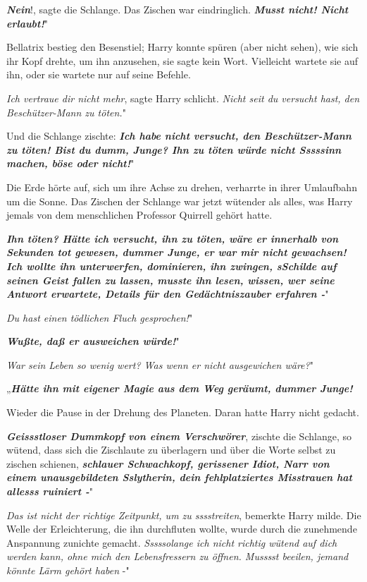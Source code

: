 \glqq \textbf{\emph{Nein}}!\grqq{}, sagte die Schlange. Das Zischen war
eindringlich. \glqq \textbf{\emph{Musst nicht! Nicht erlaubt!}}"

Bellatrix bestieg den Besenstiel; Harry konnte spüren (aber nicht sehen), wie
sich ihr Kopf drehte, um ihn anzusehen, sie sagte kein Wort. Vielleicht wartete
sie auf ihn, oder sie wartete nur auf seine Befehle.

\glqq \emph{Ich vertraue dir nicht mehr}\grqq{}, sagte Harry schlicht. \glqq
\emph{Nicht seit du versucht hast, den Beschützer-Mann zu töten.}"

Und die Schlange zischte: \glqq \textbf{\emph{Ich habe nicht versucht, den
Beschützer-Mann zu töten! Bist du dumm, Junge? Ihn zu töten würde nicht Sssssinn
machen, böse oder nicht!}}"

Die Erde hörte auf, sich um ihre Achse zu drehen, verharrte in ihrer Umlaufbahn
um die Sonne. Das Zischen der Schlange war jetzt wütender als alles, was Harry
jemals von dem menschlichen Professor Quirrell gehört hatte.

\glqq \textbf{\emph{Ihn töten? Hätte ich versucht, ihn zu töten, wäre er
innerhalb von Sekunden tot gewesen, dummer Junge, er war mir nicht gewachsen!
Ich wollte ihn unterwerfen, dominieren, ihn zwingen, sSchilde auf seinen Geist
fallen zu lassen, musste ihn lesen, wissen, wer seine Antwort erwartete, Details
für den Gedächtniszauber erfahren -}}"

\glqq \emph{Du hast einen tödlichen Fluch gesprochen!}"

\glqq \textbf{\emph{Wußte, daß er ausweichen würde!}}"

\glqq \emph{War sein Leben so wenig wert? Was wenn er nicht ausgewichen wäre?}"

„\textbf{\emph{Hätte ihn mit eigener Magie aus dem Weg geräumt, dummer
Junge!}}\grqq{}

Wieder die Pause in der Drehung des Planeten. Daran hatte Harry nicht gedacht.

\glqq \textbf{\emph{Geissstloser Dummkopf von einem Verschwörer}}\grqq{},
zischte die Schlange, so wütend, dass sich die Zischlaute zu überlagern und über
die Worte selbst zu zischen schienen, \glqq \textbf{\emph{schlauer Schwachkopf,
gerissener Idiot, Narr von einem unausgebildeten Sslytherin, dein
fehlplatziertes Misstrauen hat allesss ruiniert -}}"

\glqq \emph{Das ist nicht der richtige Zeitpunkt, um zu sssstreiten}\grqq{},
bemerkte Harry milde. Die Welle der Erleichterung, die ihn durchfluten wollte,
wurde durch die zunehmende Anspannung zunichte gemacht. \glqq \emph{Sssssolange
ich nicht richtig wütend auf dich werden kann, ohne mich den Lebensfressern zu
öffnen. Musssst beeilen, jemand könnte Lärm gehört haben} -"

